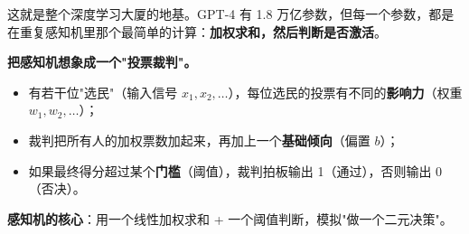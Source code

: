 \documentclass[a4paper,11pt]{ctexart}
\begin{document}
这就是整个深度学习大厦的地基。GPT-4 有 1.8 万亿参数，但每一个参数，都是在重复感知机里那个最简单的计算：\textbf{加权求和，然后判断是否激活}。

\begin{metaphorbox}
    \textbf{把感知机想象成一个"投票裁判"。}

    \begin{itemize}
        \item 有若干位"选民"（输入信号 $x_1, x_2, \ldots$），每位选民的投票有不同的\textbf{影响力}（权重 $w_1, w_2, \ldots$）；
        \item 裁判把所有人的加权票数加起来，再加上一个\textbf{基础倾向}（偏置 $b$）；
        \item 如果最终得分超过某个\textbf{门槛}（阈值），裁判拍板输出 1（通过），否则输出 0（否决）。
    \end{itemize}

    \textbf{感知机的核心}：用一个线性加权求和 + 一个阈值判断，模拟"做一个二元决策"。
\end{metaphorbox}
\end{document}

